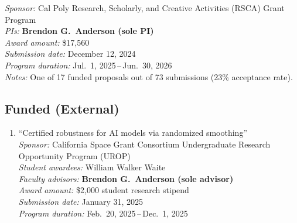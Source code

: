 \begin{grants}
\begin{enumerate}[label={\arabic*.}]
	\textit{Sponsor:} Cal Poly Research, Scholarly, and Creative Activities (RSCA) Grant Program \\
	\textit{PIs:} \textbf{Brendon G.\ Anderson (sole PI)} \\
	\textit{Award amount:} \$17,560 \\
	\textit{Submission date:} December 12, 2024 \\
	\textit{Program duration:} Jul.\ 1, 2025\,--\,Jun.\ 30, 2026 \\
	\textit{Notes:} One of 17 funded proposals out of 73 submissions (23\% acceptance rate).
\end{enumerate}

\vspace*{\baselineskip}

\subsection{Funded (External)}
\begin{enumerate}[label={\arabic*.}]
	\item ``Certified robustness for AI models via randomized smoothing''\\
	\textit{Sponsor:} California Space Grant Consortium Undergraduate Research Opportunity Program (UROP) \\
	\textit{Student awardees:} William Walker Waite \\
	\textit{Faculty advisors:} \textbf{Brendon G.\ Anderson (sole advisor)} \\
	\textit{Award amount:} \$2,000 student research stipend \\
	\textit{Submission date:} January 31, 2025 \\
	\textit{Program duration:} Feb.\ 20, 2025\,--\,Dec.\ 1, 2025
\end{enumerate}

\vspace*{\baselineskip}


\end{grants}
